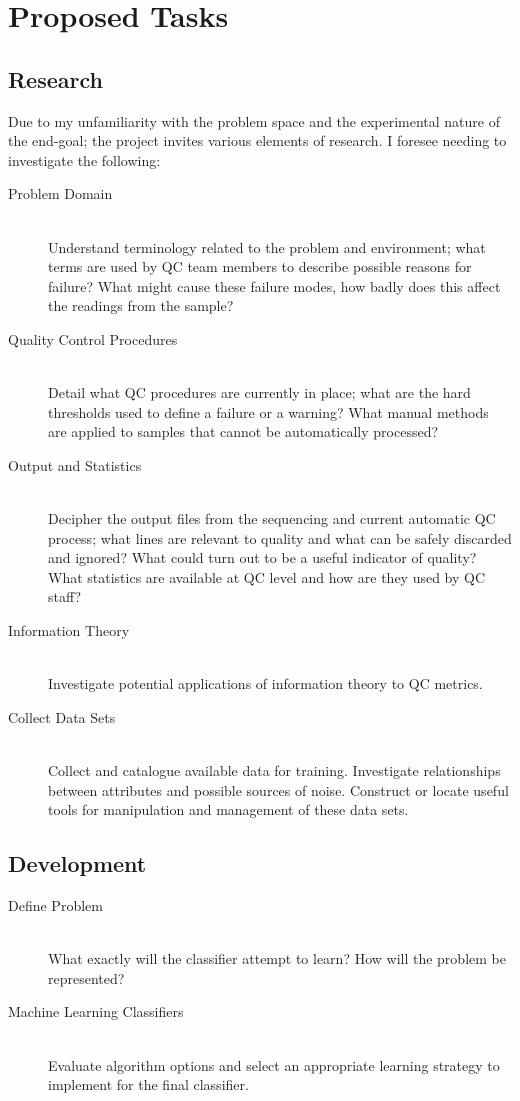\section{Proposed Tasks}
    \subsection{Research}
        Due to my unfamiliarity with the problem space and the experimental nature of the end-goal; the project invites various elements of research. I foresee needing to investigate the following:
        \begin{description}
            \item[Problem Domain] \hfill \\
                Understand terminology related to the problem and environment; what terms are used by QC team members to describe possible reasons for failure? What might cause these failure modes, how badly does this affect the readings from the sample?
            \item[Quality Control Procedures] \hfill \\
                Detail what QC procedures are currently in place; what are the hard thresholds used to define a failure or a warning? What manual methods are applied to samples that cannot be automatically processed?
            \item[Output and Statistics] \hfill \\
                Decipher the output files from the sequencing and current automatic QC process; what lines are relevant to quality and what can be safely discarded and ignored? What could turn out to be a useful indicator of quality? What statistics are available at QC level and how are they used by QC staff?
            \item[Information Theory] \hfill \\
                Investigate potential applications of information theory to QC metrics.
            \item[Collect Data Sets] \hfill \\
                Collect and catalogue available data for training. Investigate relationships between attributes and possible sources of noise. Construct or locate useful tools for manipulation and management of these data sets.
        \end{description}

    \subsection{Development}
        \begin{description}
            \item[Define Problem] \hfill \\
                What exactly will the classifier attempt to learn? How will the problem be represented?
            \item[Machine Learning Classifiers] \hfill \\
                Evaluate algorithm options and select an appropriate learning strategy to implement for the final classifier.
        \end{description}

